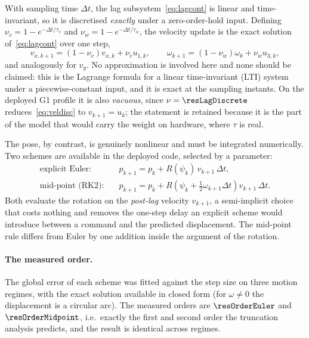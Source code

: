 \documentclass[11pt,a4paper]{article}
\begin{document}
With sampling time $\Delta t$, the lag subsystem~\eqref{eq:lagcont} is linear and time-invariant, so it is
discretised \emph{exactly} under a zero-order-hold input. Defining
$\nu_v = 1-e^{-\Delta t/\tau_v}$ and $\nu_w = 1-e^{-\Delta t/\tau_w}$, the velocity update is the
exact solution of~\eqref{eq:lagcont} over one step,
\begin{equation}
  v_{x,k+1}=(1-\nu_v)v_{x,k}+\nu_v u_{1,k},\qquad
  \omega_{k+1}=(1-\nu_w)\omega_{k}+\nu_w u_{3,k},
  \label{eq:veldisc}
\end{equation}
and analogously for $v_y$. No approximation is involved here and none should be claimed: this is the Lagrange
formula for a linear time-invariant (LTI) system under a piecewise-constant input, and it is exact at the sampling instants. On the
deployed G1 profile it is also \emph{vacuous}, since $\nu=\resLagDiscrete$ reduces~\eqref{eq:veldisc} to
$v_{k+1}=u_k$; the statement is retained because it is the part of the model that would carry the weight on
hardware, where $\tau$ is real.

The pose, by contrast, is genuinely nonlinear and must be integrated numerically. Two schemes are available
in the deployed code, selected by a parameter:
\begin{align}
  \text{explicit Euler:}\quad & p_{k+1} = p_k + R(\psi_k)\,v_{k+1}\,\Delta t,
  \label{eq:euler}\\
  \text{mid-point (RK2):}\quad & p_{k+1} = p_k + R\!\left(\psi_k+\tfrac{1}{2}\omega_{k+1}\Delta t\right)v_{k+1}\,\Delta t.
  \label{eq:midpoint}
\end{align}
Both evaluate the rotation on the \emph{post-lag} velocity $v_{k+1}$, a semi-implicit choice that costs
nothing and removes the one-step delay an explicit scheme would introduce between a command and the predicted
displacement. The mid-point rule differs from Euler by one addition inside the argument of the rotation.

\paragraph{The measured order.} The global error of each scheme was fitted against the step size on three
motion regimes, with the exact solution available in closed form (for $\omega\neq0$ the displacement is a
circular arc). The measured orders are $\resOrderEuler$ and $\resOrderMidpoint$, i.e.\ exactly the first and
second order the truncation analysis predicts, and the result is identical across regimes.
\end{document}
